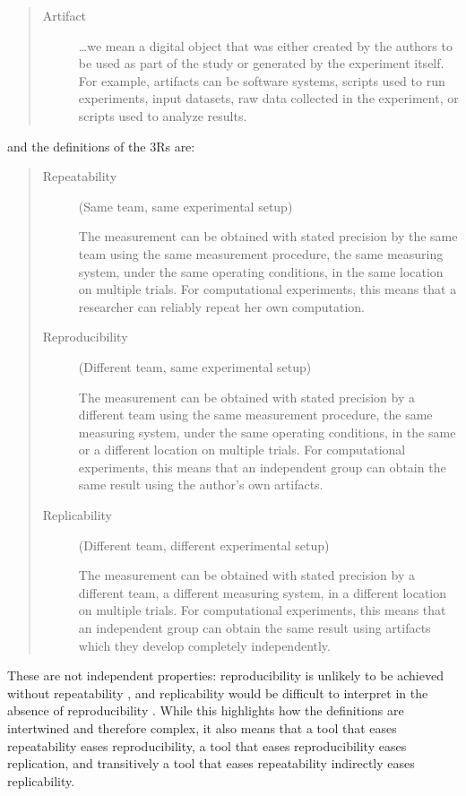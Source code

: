 \documentclass[logo,msc,dsti]{style/infthesis}    %
\begin{document}
\begin{quote}
\begin{description}
\item[Artifact]

\ldots we mean a digital object that was either created by the authors to be used as part of the study or generated by the experiment itself. For example, artifacts can be software systems, scripts used to run experiments, input datasets, raw data collected in the experiment, or scripts used to analyze results.
\end{description}
\end{quote}
and the definitions of the 3Rs are:

\begin{quote}
\begin{description}
\item[Repeatability] (Same team, same experimental setup)

The measurement can be obtained with stated precision by the same team using the same measurement procedure, the same measuring system, under the same operating conditions, in the same location on multiple trials. For computational experiments, this means that a researcher can reliably repeat her own computation.
\item[Reproducibility] (Different team, same experimental setup)

The measurement can be obtained with stated precision by a different team using the same measurement procedure, the same measuring system, under the same operating conditions, in the same or a different location on multiple trials. For computational experiments, this means that an independent group can obtain the same result using the author’s own artifacts.

\item[Replicability] (Different team, different experimental setup)

The measurement can be obtained with stated precision by a different team, a different measuring system, in a different location on multiple trials. For computational experiments, this means that an independent group can obtain the same result using artifacts which they develop completely independently.
\end{description}
\end{quote}
%
These are not independent properties: reproducibility is unlikely to be achieved without repeatability \cite{hill2022reproducibility}, and replicability would be difficult to interpret in the absence of reproducibility \cite{nuijten2018verify}. While this highlights how the definitions are intertwined and therefore complex, it also means that a tool that eases repeatability eases reproducibility, a tool that eases reproducibility eases replication, and transitively a tool that eases repeatability indirectly eases replicability.
\end{document}

